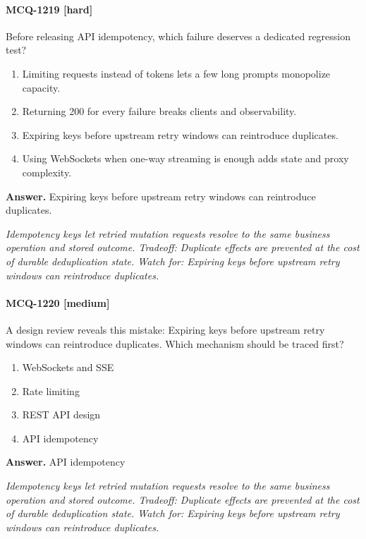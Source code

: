 \paragraph{MCQ-1219 [hard]} Before releasing API idempotency, which failure deserves a dedicated regression test?
\begin{enumerate}[label=\Alph*.]
\item Limiting requests instead of tokens lets a few long prompts monopolize capacity.
\item Returning 200 for every failure breaks clients and observability.
\item Expiring keys before upstream retry windows can reintroduce duplicates.
\item Using WebSockets when one-way streaming is enough adds state and proxy complexity.
\end{enumerate}
\noindent\textbf{Answer.} Expiring keys before upstream retry windows can reintroduce duplicates.
\par\textit{Idempotency keys let retried mutation requests resolve to the same business operation and stored outcome. Tradeoff: Duplicate effects are prevented at the cost of durable deduplication state. Watch for: Expiring keys before upstream retry windows can reintroduce duplicates.}
\paragraph{MCQ-1220 [medium]} A design review reveals this mistake: Expiring keys before upstream retry windows can reintroduce duplicates. Which mechanism should be traced first?
\begin{enumerate}[label=\Alph*.]
\item WebSockets and SSE
\item Rate limiting
\item REST API design
\item API idempotency
\end{enumerate}
\noindent\textbf{Answer.} API idempotency
\par\textit{Idempotency keys let retried mutation requests resolve to the same business operation and stored outcome. Tradeoff: Duplicate effects are prevented at the cost of durable deduplication state. Watch for: Expiring keys before upstream retry windows can reintroduce duplicates.}
